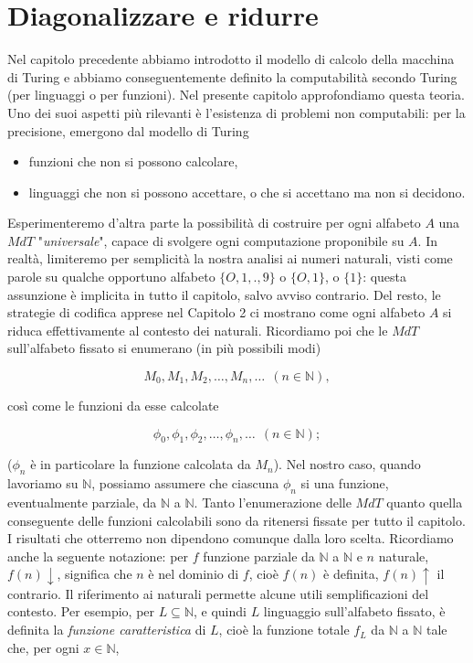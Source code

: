 \section{Diagonalizzare e ridurre}

Nel capitolo precedente abbiamo introdotto il modello di calcolo della macchina
di Turing e abbiamo conseguentemente definito la computabilità secondo Turing
(per linguaggi o per funzioni). Nel presente capitolo approfondiamo questa teoria.
Uno dei suoi aspetti più rilevanti è l'esistenza di problemi non computabili: per la
precisione, emergono dal modello di Turing

\begin{itemize}
    \item funzioni che non si possono calcolare,
    \item linguaggi che non si possono accettare, o che si accettano ma non si
          decidono.
\end{itemize}

Esperimenteremo d'altra parte la possibilità di costruire per ogni alfabeto $A$ una $MdT$
"\textit{universale}", capace di svolgere ogni computazione proponibile su $A$.
In realtà, limiteremo per semplicità la nostra analisi ai numeri naturali, visti come parole su
qualche opportuno alfabeto $\{O, 1, . , 9\}$ o $\{O, 1\}$, o $\{1\}$:
questa assunzione è
implicita in tutto il capitolo, salvo avviso contrario. Del resto, le strategie di
codifica apprese nel Capitolo 2 ci mostrano come ogni alfabeto $A$ si riduca
effettivamente al contesto dei naturali. Ricordiamo poi che le $MdT$ sull'alfabeto
fissato si enumerano (in più possibili modi)

$$
    M_0, M_1, M_2, \ldots, M_n, \ldots \ \ (n \in \mathbb{N}),
$$

così come le funzioni da esse calcolate

$$
    \phi_0, \phi_1, \phi_2, \ldots, \phi_n, \ldots \ \ (n \in \mathbb{N});
$$

($\phi_n$ è in particolare la funzione calcolata da $M_n$). Nel nostro caso, quando
lavoriamo su $\mathbb{N}$, possiamo assumere che ciascuna $\phi_n$ si una funzione,
eventualmente parziale, da $\mathbb{N}$ a $\mathbb{N}$. Tanto l'enumerazione delle
$MdT$ quanto quella conseguente delle funzioni calcolabili sono da ritenersi fissate
per tutto il capitolo. I risultati che otterremo non dipendono comunque dalla loro
scelta. Ricordiamo anche la seguente notazione: per $f$ funzione parziale da
$\mathbb{N}$ a $\mathbb{N}$ e $n$ naturale, $f(n) \downarrow$, significa che $n$ è
nel dominio di $f$, cioè $f(n)$ è definita, $f(n) \uparrow$ il contrario. Il
riferimento ai naturali permette alcune utili semplificazioni del contesto. Per
esempio, per $L \subseteq \mathbb{N}$, e quindi $L$ linguaggio sull'alfabeto fissato, è definita la
\textit{funzione caratteristica} di $L$, cioè la funzione totale $f_L$ da $\mathbb{N}$
a $\mathbb{N}$ tale che, per ogni $x \in \mathbb{N}$,

